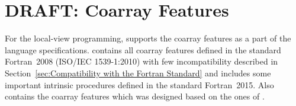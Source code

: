 \chapter{DRAFT: Coarray Features}
\label{chap:DRAFT: Coarray Features}

\newcommand{\onlyF}{{\tt [F]}} 
\newcommand{\onlyC}{{\tt [C]}} 

\newenvironment{Constraints}{\subsubsection*{Constraints}
 \begin{enumerate}}{\end{enumerate}}

\newenvironment{Constraints F}{\subsubsection*{Constraints {\onlyF}}
 \begin{enumerate}}{\end{enumerate}}

\newenvironment{Constraints C}{\subsubsection*{Constraints {\onlyC}}
 \begin{enumerate}}{\end{enumerate}}

\newenvironment{Restriction}{\subsubsection*{Restriction}
 \begin{itemize}}{\end{itemize}}

\newcommand{\NEW}[1]{\mytextcolor{red}{#1}}



\bigskip


For the local-view programming, {\XMP} supports the coarray features
as a part of the language specifications.
{\XMPF} contains all coarray features defined in the standard Fortran~2008
(ISO/IEC 1539-1:2010) with few incompatibility described in 
Section~\ref{sec:Compatibility with the Fortran Standard}
and includes some important intrinsic procedures defined in 
the standard Fortran~2015.
Also {\XMPC} contains the coarray features which was designed based on
the ones of {\XMPF}.


